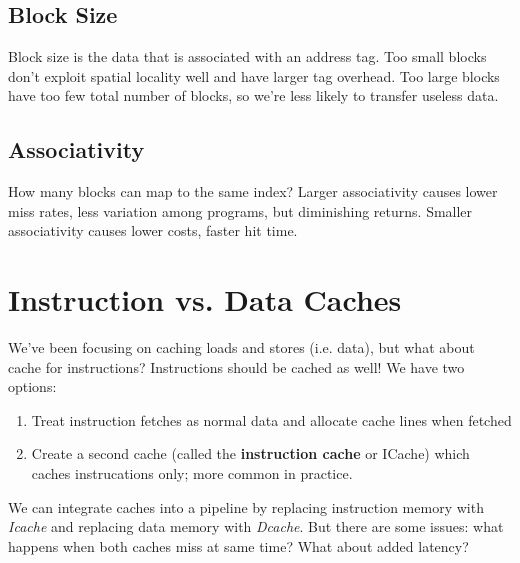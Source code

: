 \subsection{Block Size}
Block size is the data that is associated with an address tag. Too small blocks don't exploit spatial locality well and have larger tag overhead. Too large blocks have too few total number of blocks, so we're less likely to transfer useless data.

\subsection{Associativity}
How many blocks can map to the same index? Larger associativity causes lower miss rates, less variation among programs, but diminishing returns. Smaller associativity causes lower costs, faster hit time.

\section{Instruction vs. Data Caches}
We've been focusing on caching loads and stores (i.e. data), but what about cache for instructions? Instructions should be cached as well! We have two options:
\begin{enumerate}
  \item Treat instruction fetches as normal data and allocate cache lines when fetched
  \item Create a second cache (called the \textbf{instruction cache} or ICache) which caches instrucations only; more common in practice.
\end{enumerate}

We can integrate caches into a pipeline by replacing instruction memory with \emph{Icache} and replacing data memory with \emph{Dcache}. But there are some issues: what happens when both caches miss at same time? What about added latency?